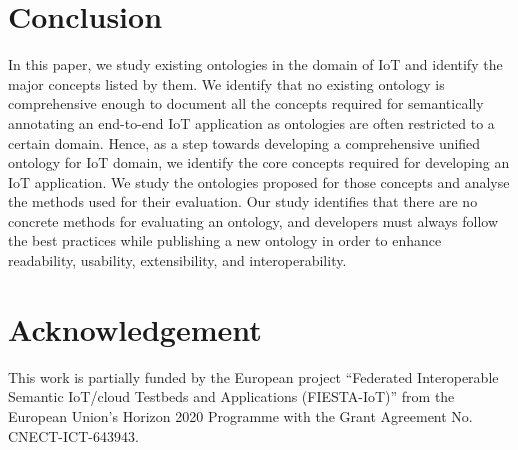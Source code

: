 \documentclass{elsart}  %
\begin{document}
\section{Conclusion}
In this paper, we study existing ontologies in the domain of IoT and identify the major concepts listed by them. We identify that no existing ontology is comprehensive enough to document all the concepts required for semantically annotating an end-to-end IoT application as ontologies are often restricted to a certain domain. Hence, as a step towards developing a comprehensive unified ontology for IoT domain, we identify the core concepts required for developing an IoT application. We study the ontologies proposed for those concepts and analyse the methods used for their evaluation. Our study identifies that there are no concrete methods for evaluating an ontology, and developers must always follow the best practices while publishing a new ontology in order to enhance readability, usability, extensibility, and interoperability.
\section*{Acknowledgement}
This work is partially funded by the European project ``Federated Interoperable Semantic IoT/cloud Testbeds and Applications (FIESTA-IoT)'' from the European Union's Horizon 2020 Programme with the Grant Agreement No. CNECT-ICT-643943.

%

\end{document}
